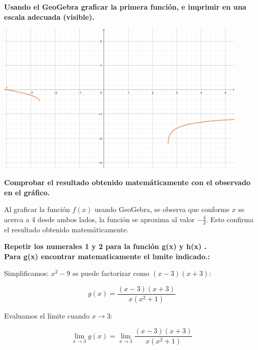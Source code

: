\documentclass[answers]{exam} %
\begin{document}
\begin{questions}
\begin{solution}
	\end{solution}

	\vspace{0.5cm}
	\question \large\textbf{Usando el GeoGebra graficar la primera función, e imprimir en una escala adecuada
		(visible).}

	\begin{minipage}{\textwidth}
		\centering
		\includegraphics[width=0.9\textwidth]{public/g1.png}\\
	\end{minipage}

	\vspace{0.5cm}
	\question \large\textbf{Comprobar el resultado obtenido matemáticamente con el observado en el gráfico.}
	\begin{solution}
		Al graficar la función \( f(x) \) usando GeoGebra, se observa que conforme \( x \) se acerca a 4 desde ambos lados, la función se aproxima al valor \( -\frac{4}{3} \). Esto confirma el resultado obtenido matemáticamente.
	\end{solution}

	\vspace{0.5cm}
	\question \large\textbf{Repetir los numerales 1 y 2 para la función g(x) y h(x)
		.}\\[2em]
	\large\textbf{Para g(x) encontrar matematicamente el lımite indicado.:}

	\begin{solution}
		Simplificamos: \( x^2 - 9 \) se puede factorizar como \( (x - 3)(x + 3) \):

		\[
			g(x) = \frac{(x - 3)(x + 3)}{x(x^2 + 1)}
		\]

		Evaluamos el límite cuando \( x \rightarrow 3 \):

		\[
			\lim_{{x \to 3}} g(x) = \lim_{{x \to 3}} \frac{(x - 3)(x + 3)}{x(x^2 + 1)}
		\]


\end{solution}
\end{questions}
\end{document}
